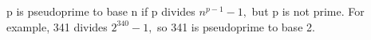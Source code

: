 p is pseudoprime to base n if p divides $n^{p-1}-1,$  but p is
not prime. For example, 341 divides $2^{340}-1,$  so 341 is 
pseudoprime to base 2.
